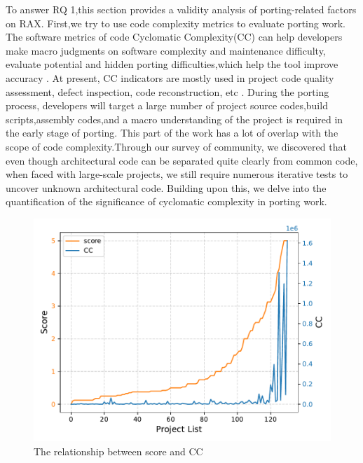\documentclass[sigconf,screen,review,anonymous]{acmart}
\begin{document}
To answer RQ 1,this section provides a validity analysis of porting-related factors on RAX.
First,we try to use code complexity metrics to evaluate porting work.
The software metrics of code Cyclomatic Complexity(CC) can help developers make macro judgments on software complexity and maintenance difficulty, evaluate potential and hidden porting difficulties,which help the tool improve accuracy \cite{2005Exploring}.
At present, CC indicators are mostly used in project code quality assessment, defect inspection, code reconstruction, etc \cite{1991Cyclomatic}.
During the porting process, developers will target a large number of project source codes,build scripts,assembly codes,and a macro understanding of the project is required in the early stage of porting.
This part of the work has a lot of overlap with the scope of code complexity.Through our survey of community, we discovered that even though architectural code can be separated quite clearly from common code, when faced with large-scale projects, we still require numerous iterative tests to uncover unknown architectural code. Building upon this, we delve into the quantification of the significance of cyclomatic complexity in porting work.
\begin{figure}
  \centering
  \includegraphics[width=\linewidth]{figure2.pdf}
  \caption{The relationship between score and CC}
  \label{fig:figure2}
\end{figure}
\end{document}
